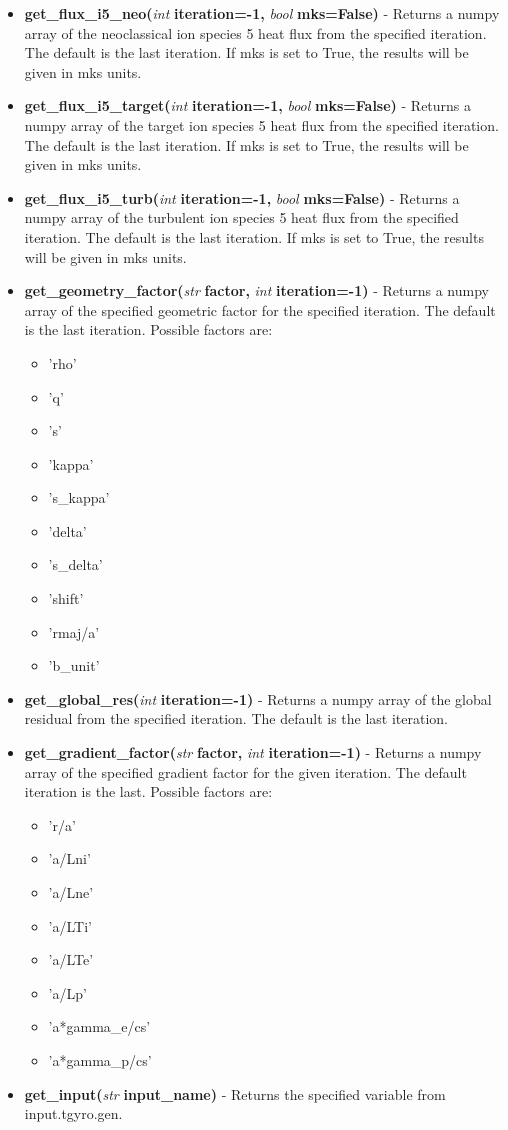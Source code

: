 \documentclass{article}
\begin{document}
\begin{itemize}
\begin{itemize}
\item \textbf{get\_flux\_i5\_neo(}\emph{int}\textbf{ iteration=-1,}\emph{ bool}\textbf{ mks=False)} - Returns a numpy array of the neoclassical ion species 5 heat flux from the specified iteration.  The default is the last iteration.  If mks is set to True, the results will be given in mks units.
\item \textbf{get\_flux\_i5\_target(}\emph{int}\textbf{ iteration=-1,}\emph{ bool}\textbf{ mks=False)} - Returns a numpy array of the target ion species 5 heat flux from the specified iteration.  The default is the last iteration.  If mks is set to True, the results will be given in mks units.
\item \textbf{get\_flux\_i5\_turb(}\emph{int}\textbf{ iteration=-1,}\emph{ bool}\textbf{ mks=False)} - Returns a numpy array of the turbulent ion species 5 heat flux from the specified iteration.  The default is the last iteration.  If mks is set to True, the results will be given in mks units.
\item \textbf{get\_geometry\_factor(}\emph{str}\textbf{ factor,}\emph{ int}\textbf{ iteration=-1)} - Returns a numpy array of the specified geometric factor for the specified iteration.  The default is the last iteration.  Possible factors are:
\begin{itemize}
\item 'rho'
\item 'q'
\item 's'
\item 'kappa'
\item 's\_kappa'
\item 'delta'
\item 's\_delta'
\item 'shift'
\item 'rmaj/a'
\item 'b\_unit'
\end{itemize}
\item \textbf{get\_global\_res(}\emph{int}\textbf{ iteration=-1)} - Returns a numpy array of the global residual from the specified iteration.  The default is the last iteration.
\item \textbf{get\_gradient\_factor(}\emph{str}\textbf{ factor,}\emph{ int}\textbf{ iteration=-1)} - Returns a numpy array of the specified gradient factor for the given iteration.  The default iteration is the last.  Possible factors are:
\begin{itemize}
\item 'r/a'
\item 'a/Lni'
\item 'a/Lne'
\item 'a/LTi'
\item 'a/LTe'
\item 'a/Lp'
\item 'a*gamma\_e/cs'
\item 'a*gamma\_p/cs'
\end{itemize}
\item \textbf{get\_input(}\emph{str}\textbf{ input\_name)} - Returns the specified variable from input.tgyro.gen.


\end{itemize}
\end{itemize}
\end{document}
